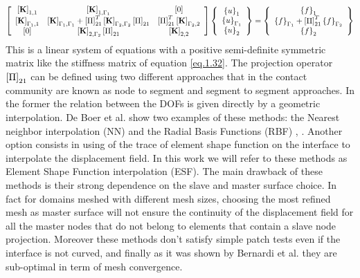   \begin{equation}
  \label{eq.33}
  \begin{aligned}
  \left[ \begin{array}{ccc} 
      \left[{\mathbf{K}}\right]_{1,1} & \left[{\mathbf{K}}\right]_{1,\Gamma_1} & \left[{0}\right] \\
     \left[{\mathbf{K}}\right]_{\Gamma_1,1} & \left[{\mathbf{K}}\right]_{\Gamma_1,\Gamma_1}+ \left[{\Pi}\right]_{21}^T\left[{\mathbf{K}}\right]_{\Gamma_2,\Gamma_2}\left[{\Pi}\right]_{21} & \left[{\Pi}\right]_{21}^T\left[{\mathbf{K}}\right]_{\Gamma_2,2}\\   
      \left[{0}\right] & \left[{\mathbf{K}}\right]_{2,\Gamma_2}\left[{\Pi}\right]_{21} & \left[{\mathbf{K}}\right]_{2,2}\end{array} \right] \left\lbrace \begin{array}{c} \left\lbrace{u}\right \rbrace_1\\\left\lbrace{u}\right \rbrace_{\Gamma_1}\\\left\lbrace{u}\right \rbrace_2
      \end{array}\right\rbrace= \left\lbrace\begin{array}{c} \left\lbrace{f}\right \rbrace_1\\\left\lbrace{f}\right \rbrace_{\Gamma_1}+\left[{\Pi}\right]_{21}^T\left\lbrace{f}\right \rbrace_{\Gamma_2}\\\left\lbrace{f}\right \rbrace_2
      \end{array}\right\rbrace
  \end{aligned}
  \end{equation}
  This is a linear system of equations with a positive semi-definite symmetric matrix like the stiffness matrix of equation \eqref{eq.1.32}. 
  The projection operator $\left[{\Pi}\right]_{21}$ can be defined using two different approaches that in the contact community are known as node to segment and segment to segment approaches. In the former the relation between the DOFs is given directly by a geometric interpolation. De Boer et al. \cite{de2007review} show two examples of these methods: the Nearest neighbor interpolation (NN) \cite{thevenaz2000interpolation} and the Radial Basis Functions (RBF) \cite{beckert2001multivariate}, \cite{smith2000evaluation}. Another option consists in using of the trace of element shape function on the interface to interpolate the displacement field. In this work we will refer to these methods as Element Shape Function interpolation (ESF).
  The main drawback of these methods is their strong dependence on the slave and master surface choice. In fact for domains meshed with different mesh sizes, choosing the most refined mesh as master surface will not ensure the continuity of the displacement field for all the master nodes that do not belong to elements that contain a slave node projection. Moreover these methods don't satisfy simple patch tests even if the interface is not curved, and finally as it was shown by Bernardi et al. \cite{bernardi1989new} they are sub-optimal in term of mesh convergence.
